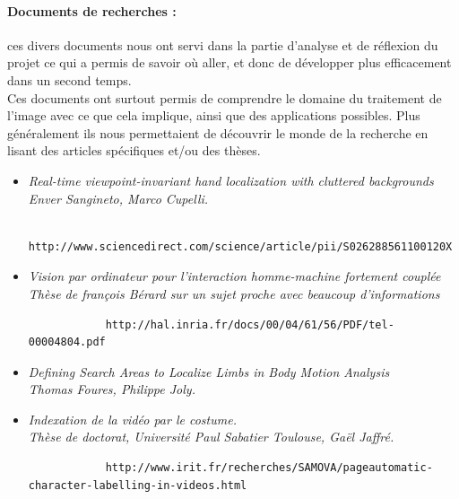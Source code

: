 \documentclass{report}
\begin{document}
	\paragraph{Documents de recherches :}
	ces divers documents nous ont servi dans la partie d'analyse et de réflexion du projet ce qui a permis de savoir où aller, et donc de développer plus efficacement dans un second temps. \\
	Ces documents ont surtout permis de comprendre le domaine du traitement de l'image avec ce que cela implique, ainsi que des applications possibles. Plus généralement ils nous permettaient de découvrir le monde de la recherche en lisant des articles spécifiques et/ou des thèses. \\
		\begin{itemize}
			\item \it{Real-time viewpoint-invariant hand localization with cluttered backgrounds} \\
			Enver Sangineto, Marco Cupelli.
			\begin{verbatim}
			http://www.sciencedirect.com/science/article/pii/S026288561100120X
			\end{verbatim}
			\item \it{Vision par ordinateur pour l’interaction homme-machine fortement couplée}\\
			Thèse de françois Bérard sur un sujet proche avec beaucoup d'informations
			\begin{verbatim}
			http://hal.inria.fr/docs/00/04/61/56/PDF/tel-00004804.pdf
			\end{verbatim}
			\item \it{Defining Search Areas to Localize Limbs in Body Motion Analysis} \\
			Thomas Foures, Philippe Joly.
			\item \it{Indexation de la vidéo par le costume.}\\ 
			Thèse de doctorat, Université Paul Sabatier Toulouse, Gaël Jaffré.
			\begin{verbatim}
			http://www.irit.fr/recherches/SAMOVA/pageautomatic-character-labelling-in-videos.html
			\end{verbatim}
		\end{itemize}
			
\end{document}
